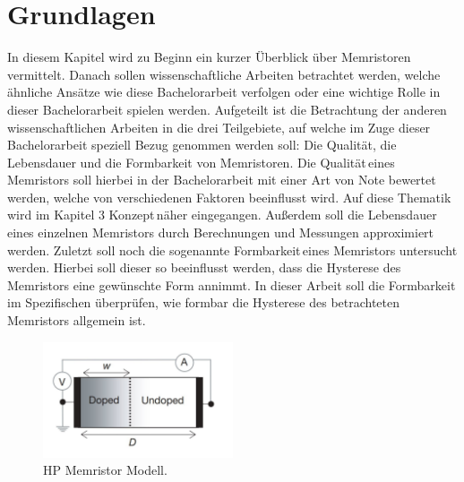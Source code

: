 

\chapter{Grundlagen}
\label{sec:Chapter2}
In diesem Kapitel wird zu Beginn ein kurzer Überblick über Memristoren vermittelt. Danach sollen wissenschaftliche Arbeiten betrachtet werden, welche ähnliche Ansätze wie diese Bachelorarbeit verfolgen oder eine wichtige Rolle in dieser Bachelorarbeit spielen werden. Aufgeteilt ist die Betrachtung der anderen wissenschaftlichen Arbeiten in die drei Teilgebiete, auf welche im Zuge dieser Bachelorarbeit speziell Bezug genommen werden soll: Die Qualität, die Lebensdauer und die Formbarkeit von Memristoren. Die \glqq Qualität\grqq\,eines Memristors soll hierbei in der Bachelorarbeit mit einer Art von Note bewertet werden, welche von verschiedenen Faktoren beeinflusst wird. Auf diese Thematik wird im Kapitel 3 \glqq Konzept\grqq\,näher eingegangen. Außerdem soll die \glqq Lebensdauer\grqq\,eines einzelnen Memristors durch Berechnungen und Messungen approximiert werden. Zuletzt soll noch die sogenannte \glqq Formbarkeit\grqq\,eines Memristors untersucht werden. Hierbei soll dieser so beeinflusst werden, dass die Hysterese des Memristors eine gewünschte Form annimmt. In dieser Arbeit soll die Formbarkeit im Spezifischen überprüfen, wie formbar die Hysterese des betrachteten Memristors allgemein ist.

\begin{figure}
  \centering
    \includegraphics[width=0.5\textwidth]{images/hp_mem.JPG}
  \caption{HP Memristor Modell.}
  \label{fig:hp_mem}
\end{figure}

